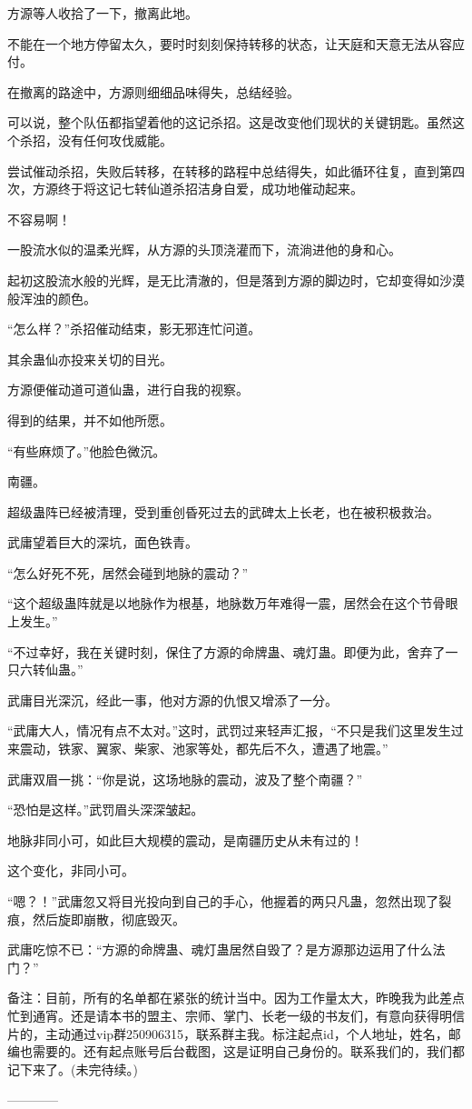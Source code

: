 \begin{this_body}
方源等人收拾了一下，撤离此地。

不能在一个地方停留太久，要时时刻刻保持转移的状态，让天庭和天意无法从容应付。

在撤离的路途中，方源则细细品味得失，总结经验。

可以说，整个队伍都指望着他的这记杀招。这是改变他们现状的关键钥匙。虽然这个杀招，没有任何攻伐威能。

尝试催动杀招，失败后转移，在转移的路程中总结得失，如此循环往复，直到第四次，方源终于将这记七转仙道杀招洁身自爱，成功地催动起来。

不容易啊！

一股流水似的温柔光辉，从方源的头顶浇灌而下，流淌进他的身和心。

起初这股流水般的光辉，是无比清澈的，但是落到方源的脚边时，它却变得如沙漠般浑浊的颜色。

“怎么样？”杀招催动结束，影无邪连忙问道。

其余蛊仙亦投来关切的目光。

方源便催动道可道仙蛊，进行自我的视察。

得到的结果，并不如他所愿。

“有些麻烦了。”他脸色微沉。

南疆。

超级蛊阵已经被清理，受到重创昏死过去的武碑太上长老，也在被积极救治。

武庸望着巨大的深坑，面色铁青。

“怎么好死不死，居然会碰到地脉的震动？”

“这个超级蛊阵就是以地脉作为根基，地脉数万年难得一震，居然会在这个节骨眼上发生。”

“不过幸好，我在关键时刻，保住了方源的命牌蛊、魂灯蛊。即便为此，舍弃了一只六转仙蛊。”

武庸目光深沉，经此一事，他对方源的仇恨又增添了一分。

“武庸大人，情况有点不太对。”这时，武罚过来轻声汇报，“不只是我们这里发生过来震动，铁家、翼家、柴家、池家等处，都先后不久，遭遇了地震。”

武庸双眉一挑：“你是说，这场地脉的震动，波及了整个南疆？”

“恐怕是这样。”武罚眉头深深皱起。

地脉非同小可，如此巨大规模的震动，是南疆历史从未有过的！

这个变化，非同小可。

“嗯？！”武庸忽又将目光投向到自己的手心，他握着的两只凡蛊，忽然出现了裂痕，然后旋即崩散，彻底毁灭。

武庸吃惊不已：“方源的命牌蛊、魂灯蛊居然自毁了？是方源那边运用了什么法门？”

备注：目前，所有的名单都在紧张的统计当中。因为工作量太大，昨晚我为此差点忙到通宵。还是请本书的盟主、宗师、掌门、长老一级的书友们，有意向获得明信片的，主动通过vip群250906315，联系群主我。标注起点id，个人地址，姓名，邮编也需要的。还有起点账号后台截图，这是证明自己身份的。联系我们的，我们都记下来了。(未完待续。)

------------

\end{this_body}


